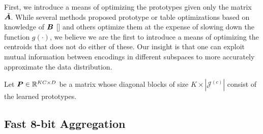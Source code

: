 First, we introduce a means of optimizing the prototypes given only the matrix $\tilde{\bm{A}}$. While several methods proposed prototype or table optimizations based on knowledge of $\bm{B}$ [] and others optimize them at the expense of slowing down the function $g(\cdot)$, we believe we are the first to introduce a means of optimizing the centroids that does not do either of these. Our insight is that one can exploit mutual information between encodings in different subspaces to more accurately approximate the data distribution.

Let $\bm{P} \in \mathbb{R}^{KC \times D}$ be a matrix whose diagonal blocks of size $K \times |\mathcal{J}^{(c)}|$ consist of the learned prototypes.


\subsection{Fast 8-bit Aggregation}








